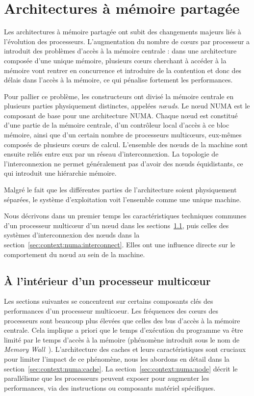 \section{Architectures à mémoire partagée}\label{sec:context:numa}


Les architectures à mémoire partagée ont subit des changements majeurs liés à l'évolution des processeurs.
L'augmentation du nombre de cœurs par processeur a introduit des problèmes d'accès à la mémoire centrale : dans une architecture composée d'une unique mémoire, plusieurs cœurs cherchant à accéder à la mémoire vont rentrer en concurrence et introduire de la contention et donc des délais dans l'accès à la mémoire, ce qui pénalise fortement les performances.

Pour pallier ce problème, les constructeurs ont divisé la mémoire centrale en plusieurs parties physiquement distinctes, appelées \emph{nœuds}.
Le nœud NUMA est le composant de base pour une architecture NUMA.
Chaque nœud est constitué d'une partie de la mémoire centrale, d'un contrôleur local d'accès à ce bloc mémoire, ainsi que d'un certain nombre de processeurs multicœurs, eux-mêmes composés de plusieurs cœurs de calcul.
L'ensemble des nœuds de la machine sont ensuite reliés entre eux par un réseau d'interconnexion.
La topologie de l'interconnexion ne permet généralement pas d'avoir des nœuds équidistants, ce qui introduit une hiérarchie mémoire.

Malgré le fait que les différentes parties de l'architecture soient physiquement séparées, le système d'exploitation voit l'ensemble comme une unique machine.

Nous décrivons dans un premier temps les caractéristiques techniques communes d'un processeur multicœur d'un nœud dans les sections~\ref{sec:context:numa:multicore}, puis celles des systèmes d'interconnexion des nœuds dans la section~\ref{sec:context:numa:interconnect}.
Elles ont une influence directe sur le comportement du nœud au sein de la machine.

\subsection{À l'intérieur d'un processeur multicœur}\label{sec:context:numa:multicore}

Les sections suivantes se concentrent sur certains composants clés des performances d'un processeur multicoeur.
Les fréquences des cœurs des processeurs sont beaucoup plus élevées que celles des bus d'accès à la mémoire centrale.
Cela implique a priori que le temps d'exécution du programme va être limité par le temps d'accès à la mémoire (phénomène introduit sous le nom de \emph{Memory Wall}~\cite{Wulf1995}).
L'architecture des caches et leurs caractéristiques sont cruciaux pour limiter l'impact de ce phénomène, nous les abordons en détail dans la section~\ref{sec:context:numa:cache}.
La section~\ref{sec:context:numa:node} décrit le parallélisme que les processeurs peuvent exposer pour augmenter les performances, via des instructions ou composants matériel spécifiques.



